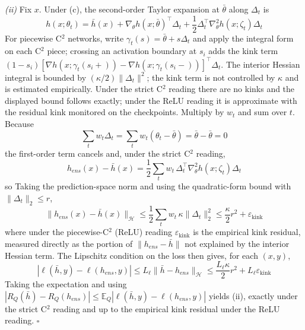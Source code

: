 \documentclass[electronics,article,submit,moreauthors]{Definitions/mdpi}
\newcommand{\add}[1]{\textcolor{addblue}{#1}}
\newcommand{\del}[1]{\textcolor{delred}{\st{#1}}}
\def\add#1{#1}%
\def\del#1{}%
\renewcommand{\add}[1]{#1}
\renewcommand{\del}[1]{}
\begin{document}
\emph{(ii)} Fix $x$. \del{The second-order Taylor expansion of \mbox{$\theta\mapsto h(x;\theta)$} at \mbox{$\bar\theta$} along \mbox{$\Delta_t$} is}\add{Under (c), the second-order Taylor expansion at $\bar\theta$ along $\Delta_t$ is}
\begin{equation}
h(x;\theta_t)=\bar h(x)+\nabla_{\theta}h(x;\bar\theta)^{\top}\Delta_t+\frac{1}{2}\Delta_t^{\top}\nabla_{\theta}^{2}h(x;\zeta_t)\Delta_t
\end{equation}
\del{with \mbox{$\zeta_t$} on the segment between \mbox{$\bar\theta$} and \mbox{$\theta_t$} (under the almost-everywhere reading, apply on the differentiable set and bound by the essential supremum).}\add{For piecewise C$^2$ networks, write $\gamma_t(s)=\bar\theta+s\Delta_t$ and apply the integral form on each C$^2$ piece; crossing an activation boundary at $s_i$ adds the kink term $(1-s_i)[\nabla h(x;\gamma_t(s_i+))-\nabla h(x;\gamma_t(s_i-))]^{\top}\Delta_t$. The interior Hessian integral is bounded by $(\kappa/2)\|\Delta_t\|^2$; the kink term is not controlled by $\kappa$ and is estimated empirically. Under the strict C$^2$ reading there are no kinks and the displayed bound follows exactly; under the ReLU reading it is approximate with the residual kink monitored on the checkpoints.} Multiply by $w_t$ and sum over $t$. Because
\begin{equation}
\sum_t w_t\Delta_t=\sum_t w_t(\theta_t-\bar\theta)=\bar\theta-\bar\theta=0
\end{equation}
the first-order term cancels\add{ and, under the strict C$^2$ reading,}
\begin{equation}
h_{ens}(x)-\bar h(x)=\frac{1}{2}\sum_t w_t\,\Delta_t^{\top}\nabla_{\theta}^{2}h(x;\zeta_t)\Delta_t
\end{equation}
\add{so} Taking the prediction-space norm and using the quadratic-form bound with $\|\Delta_t\|_2\leq r$,
\begin{equation}
\|h_{ens}(x)-\bar h(x)\|_{\mathcal{H}}\leq\frac{1}{2}\sum_t w_t\,\kappa\|\Delta_t\|_2^{2}\leq\frac{\kappa}{2}r^{2}\add{+\varepsilon_{\mathrm{kink}}}
\end{equation}
\add{where under the piecewise-C$^2$ (ReLU) reading $\varepsilon_{\mathrm{kink}}$ is the empirical kink residual, measured directly as the portion of $\|h_{ens}-\bar h\|$ not explained by the interior Hessian term.} The Lipschitz condition on the loss then gives, for each $(x,y)$,
\begin{equation}
|\ell(\bar h,y)-\ell(h_{ens},y)|\leq L_{\ell}\|\bar h-h_{ens}\|_{\mathcal{H}}\leq\frac{L_{\ell}\kappa}{2}r^{2}\add{+L_{\ell}\varepsilon_{\mathrm{kink}}}
\end{equation}
Taking the expectation and using $|R_Q(\bar h)-R_Q(h_{ens})|\leq\mathbb{E}_Q|\ell(\bar h,y)-\ell(h_{ens},y)|$ yields (ii)\add{, exactly under the strict C$^2$ reading and up to the empirical kink residual under the ReLU reading}. \hfill$\square$
\end{document}
